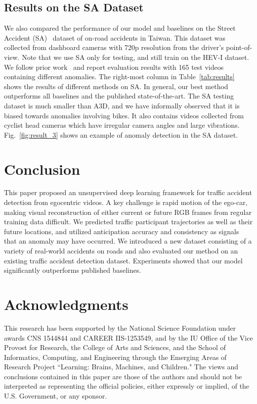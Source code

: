 \documentclass[letterpaper, 10 pt, conference]{ieeeconf}
\theoremstyle{definition}
\theoremstyle{remark}
\begin{document}
\subsection{Results on the SA Dataset}
We also compared the performance of our model and baselines on the
Street Accident (SA)~\cite{chan2016anticipating} dataset of on-road
accidents in Taiwan. This dataset was collected from
dashboard cameras with 720p resolution from the driver's
point-of-view. Note that we use SA only for testing,
and still train on the HEV-I dataset.
We follow prior work~\cite{chan2016anticipating} and report evaluation results with
165 test videos containing different anomalies.
The right-most column in
Table~\ref{tab:results} shows the results of different methods on SA.
In general, our best method outperforms all baselines and the
published state-of-the-art. The SA testing dataset is much smaller than
A3D,  and we have informally observed that it is biased towards anomalies involving bikes.
It also contains  videos collected from
cyclist head cameras which have irregular camera angles and large
vibrations. Fig.~\ref{fig:result_3} shows an example of anomaly
detection in the SA dataset. 
 \vspace{2pt}
\section{Conclusion}
\vspace{2pt}
This paper proposed an unsupervised deep learning framework for
traffic accident detection from egocentric videos. A key challenge is rapid motion of the ego-car,
making visual reconstruction of either current or future RGB frames
from regular training data difficult.
We predicted traffic participant trajectories as well as
their future locations, and utilized anticipation
accuracy and consistency as signals
that an anomaly may have occurred. We introduced a new dataset consisting of a variety of
real-world accidents on roads and also evaluated our method on an existing traffic accident detection dataset.  Experiments showed that our model
significantly outperforms published baselines.
 
\vspace{2pt}
\section{Acknowledgments}
\vspace{2pt}
This research has been supported by the National Science Foundation
under awards CNS 1544844 and CAREER IIS-1253549,
and by the IU Office of the Vice Provost for Research,
the College of Arts and Sciences, and the School of Informatics,
Computing, and Engineering through the Emerging Areas of Research
Project ``Learning: Brains, Machines, and Children."
The views and conclusions contained in this
paper are those of the authors and should not be interpreted
as representing the official policies, either expressly or implied,
of the U.S. Government, or any sponsor.



\end{document}
